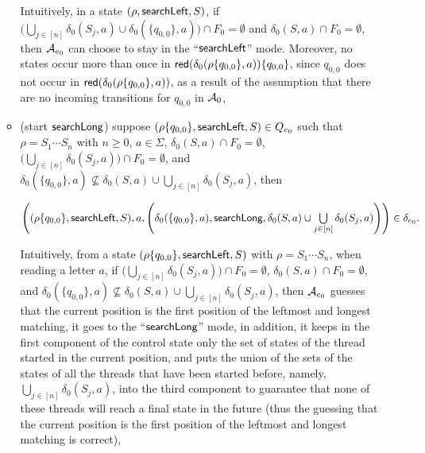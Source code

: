 \begin{itemize}
\begin{itemize}
		\medskip

		Intuitively, in a state $(\rho, \mathsf{searchLeft}, S)$, if $\big(\bigcup \limits_{j \in [n]} \delta_0(S_j, a) \cup \delta_0(\{q_{0,0}\},a)\big) \cap F_0 = \emptyset$ and $\delta_0(S,a) \cap F_0 = \emptyset$, then $\mathcal{A}_{e_0}$ can choose to stay in the ``$\mathsf{searchLeft}$'' mode.
		Moreover, no states occur more than once in $\mathsf{red}(\delta_0(\rho \{q_{0,0}\}, a)) \{q_{0,0}\}$, since $q_{0,0}$ does not occur in $\mathsf{red}(\delta_0(\rho\{q_{0,0}\}, a))$, as a result of the assumption that there are no incoming transitions for $q_{0,0}$ in $\mathcal{A}_0$,
		\item (start $\mathsf{searchLong}$) suppose $(\rho \{q_{0,0}\}, \mathsf{searchLeft}, S) \in Q_{e_0}$ such that $\rho = S_1 \cdots S_n$ with $n \ge 0$, $a \in \Sigma$, $\delta_0(S,a) \cap F_0 = \emptyset$, $\big(\bigcup \limits_{j \in [n]} \delta_0(S_j, a) \big) \cap F_0 = \emptyset$,  and $\delta_0(\{q_{0,0}\}, a) \not \subseteq \delta_0(S, a) \cup \bigcup \limits_{j \in [n]} \delta_0(S_j, a)$, then

		\medskip
		$\left((\rho \{q_{0,0}\}, \mathsf{searchLeft}, S), a, \left(\delta_0(\{q_{0,0}\}, a), \mathsf{searchLong}, \delta_0(S, a) \cup \bigcup \limits_{j \in [n]} \delta_0(S_j, a) \right) \right) \in \delta_{e_0}.$

		\medskip
		Intuitively, from a state $(\rho \{q_{0,0}\}, \mathsf{searchLeft}, S)$ with $\rho = S_1 \cdots S_n$, when reading a letter $a$, if $\big(\bigcup \limits_{j \in [n]} \delta_0(S_j, a) \big) \cap F_0 = \emptyset$, $\delta_0(S,a) \cap F_0 = \emptyset$, and $\delta_0(\{q_{0,0}\}, a) \not \subseteq \delta_0(S, a) \cup \bigcup \limits_{j \in [n]} \delta_0(S_j, a)$, then $\mathcal{A}_{e_0}$ guesses that the current position is the first position of the leftmost and longest matching, it goes to the ``$\mathsf{searchLong}$'' mode, in addition, it keeps in the first component of the control state only the set of states of the thread started in the current position, and puts the union of the sets of the states of all the threads that have been started before, namely, $\bigcup \limits_{j \in [n]} \delta_0(S_j, a)$, into the third component to guarantee that none of these threads will reach a final state in the future (thus the guessing that the current position is the first position of the leftmost and longest matching is correct),



\end{itemize}
\end{itemize}
